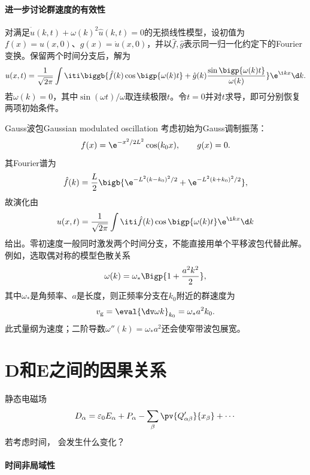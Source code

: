 \paragraph{进一步讨论群速度的有效性}

对满足$\ddot{\hat u}(k,t)+\omega(k)^2\hat u(k,t)=0$的无损线性模型，设初值为$f(x)=u(x,0)$、$g(x)=\dot u(x,0)$，并以$\hat f,\hat g$表示同一归一化约定下的Fourier变换。保留两个时间分支后，解为
\[
    u(x,t)=\frac1{\sqrt{2\pi}}\int\iti
    \biggb{\hat f(k)\cos\bigp{\omega(k)t}
    +\hat g(k)\frac{\sin\bigp{\omega(k)t}}{\omega(k)}}\e^{\i kx}\d k.
\]
若$\omega(k)=0$，其中$\sin(\omega t)/\omega$取连续极限$t$。令$t=0$并对$t$求导，即可分别恢复两项初始条件。
\begin{example}{Gauss波包}{Gaussian modulated oscillation}
    考虑初始为Gauss调制振荡：
    \[
        f(x)=\e^{-x^2/2L^2}\cos(k_0x),\qquad g(x)=0.
    \]
    其Fourier谱为
    \[
        \hat f(k)=\frac L2\bigb{\e^{-L^2(k-k_0)^2/2}+\e^{-L^2(k+k_0)^2/2}},
    \]
    故演化由
    \[
        u(x,t)=\frac1{\sqrt{2\pi}}\int\iti\hat f(k)\cos\bigp{\omega(k)t}\e^{\i kx}\d k
    \]
    给出。零初速度一般同时激发两个时间分支，不能直接用单个平移波包代替此解。
    \tcblower
    例如，选取偶对称的模型色散关系
    \[
        \omega(k)=\omega_\ast\Bigp{1+\frac{a^2k^2}2},
    \]
    其中$\omega_\ast$是角频率、$a$是长度，则正频率分支在$k_0$附近的群速度为
    \[
        v_\text g=\eval{\dv\omega k}_{k_0}=\omega_\ast a^2k_0.
    \]
    此式量纲为速度；二阶导数$\omega''(k)=\omega_\ast a^2$还会使窄带波包展宽。
\end{example}

\section{\texorpdfstring{$\bm D$}{D}和\texorpdfstring{$\bm E$}{E}之间的因果关系}

静态电磁场
\[
    D_\alpha=\varepsilon_0E_\alpha+P_\alpha-\sum_\beta\pv{Q'_{\alpha\beta}}{x_\beta}+\cdots
\]
若考虑时间，
会发生什么变化？

\paragraph{时间非局域性}

